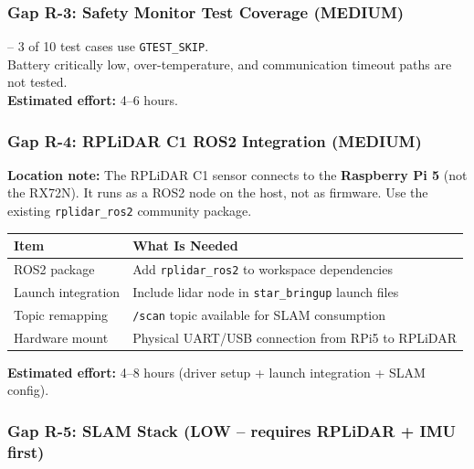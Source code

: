 \documentclass[12pt,a4paper]{article}
\newcommand{\filepath}[1]{\textcolor{dirgreen}{\texttt{\seqsplit{#1}}}}
\begin{document}
\subsubsection{Gap R-3: Safety Monitor Test Coverage (MEDIUM)}

\begin{warnbox}
  \filepath{star\_safety\_monitor/} -- 3 of 10 test cases use \texttt{GTEST\_SKIP}.\\
  Battery critically low, over-temperature, and communication timeout paths are not tested.\\
  \textbf{Estimated effort:} 4--6 hours.
\end{warnbox}

\subsubsection{Gap R-4: RPLiDAR C1 ROS2 Integration (MEDIUM)}

\begin{warnbox}
  \textbf{Location note:} The RPLiDAR C1 sensor connects to the \textbf{Raspberry Pi 5} (not the RX72N).
  It runs as a ROS2 node on the host, not as firmware. Use the existing
  \texttt{rplidar\_ros2} community package.
\end{warnbox}

\begin{center}
\small
\begin{tabular}{L{4cm}L{10cm}}
  \toprule
  \textbf{Item} & \textbf{What Is Needed} \\
  \midrule
  ROS2 package & Add \texttt{rplidar\_ros2} to workspace dependencies \\
  Launch integration & Include lidar node in \texttt{star\_bringup} launch files \\
  Topic remapping & \texttt{/scan} topic available for SLAM consumption \\
  Hardware mount & Physical UART/USB connection from RPi5 to RPLiDAR \\
  \bottomrule
\end{tabular}
\end{center}

\textbf{Estimated effort:} 4--8 hours (driver setup + launch integration + SLAM config).

\subsubsection{Gap R-5: SLAM Stack (LOW -- requires RPLiDAR + IMU first)}
\end{document}

